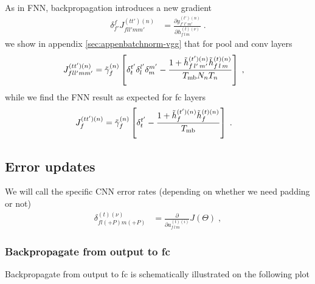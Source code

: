 As in FNN, backpropagation introduces a new gradient
\begin{align}
\delta^f_{f'}J^{(tt')(n)}_{fll'mm'}&=
%
\frac{\partial y^{(t')(n)}_{f'\,l'\,m'}}{\partial h_{f\,l\,m}^{(t)(\nu)}}\;.
\end{align}
we show in appendix \ref{sec:appenbatchnorm-vgg} that for pool and conv layers
\begin{align}
J^{(tt')(n)}_{fll'mm'}&=\tilde{\gamma}^{(n)}_f \left[\delta^{t'}_t\delta^{l'}_l\delta^{m'}_m-
%
\frac{1+\tilde{h}_{f\,l'\,m'}^{(t')(n)}\tilde{h}_{f\,l\,m}^{(t)(n)}}{T_{{\rm mb}}N_nT_n}\right]\;,
\end{align}
while we find the FNN result as expected for fc layers
\begin{align}
J^{(tt')(n)}_{f}&=\tilde{\gamma}^{(n)}_f \left[\delta^{t'}_t-
%
\frac{1+\tilde{h}_{f}^{(t')(n)}\tilde{h}_{f}^{(t)(n)}}{T_{{\rm mb}}}\right]\;.
\end{align}

\subsection{Error updates}

We will call the specific CNN error rates (depending on whether we need padding or not)
\begin{align}
\delta^{(t)(\nu)}_{fl(+P)m(+P)}&=\frac{\partial }{\partial a_{f\,l\,m}^{(t)(i)}}J(\Theta)\;,
\end{align}


\subsubsection{Backpropagate from output to fc}

Backpropagate from output to fc is schematically illustrated on the following plot

